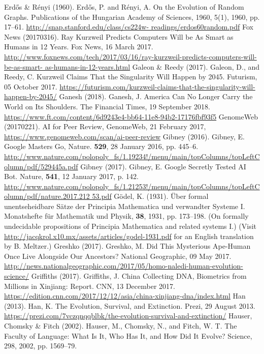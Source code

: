 \begin{multicols}{2}
\begin{thebibliography}{99}
 Erdős \& Rényi (1960). Erdős, P. and Rényi, A. On the Evolution of Random Graphs. Publications of the Hungarian Academy of Sciences, 1960, 5(1), 1960, pp. 17--61. \url{http://snap.stanford.edu/class/cs224w- readings/erdos60random.pdf}
 Fox News (20170316). Ray Kurzweil Predicts Computers Will be As Smart as Humans in 12 Years. Fox News, 16 March 2017. \url{http://www.foxnews.com/tech/2017/03/16/ray-kurzweil-predicts-computers-will-be-as-smart- as-humans-in-12-years.html}
 Galeon \& Reedy (2017). Galeon, D., and Reedy, C. Kurzweil Claims That the Singularity Will Happen by 2045. Futurism, 05 October 2017. \url{https://futurism.com/kurzweil-claims-that-the-singularity-will-happen-by-2045/}
 Ganesh (2018). Ganesh, J. America Can No Longer Carry the World on Its Shoulders. The Financial Times, 19 September 2018. \url{https://www.ft.com/content/6d9243e4-bb64-11e8-94b2-17176fbf93f5}
 GenomeWeb (20170221). AI for Peer Review, GenomeWeb, 21 February 2017, \url{https://www.genomeweb.com/scan/ai-peer-review}
 Gibney (2016). Gibney, E. Google Masters Go, Nature. \textbf{529}, 28 January 2016, pp. 445--6. \url{http://www.nature.com/polopoly_fs/1.19234!/menu/main/topColumns/topLeftColumn/pdf/529445a.pdf}
 Gibney (2017). Gibney, E. Google Secretly Tested AI Bot. Nature, \textbf{541}, 12 January 2017, p. 142. \url{http://www.nature.com/polopoly_fs/1.21253!/menu/main/topColumns/topLeftColumn/pdf/nature.2017.212 53.pdf}
 Gödel, K. (1931). Über formal unentseheidbare Sätze der Principia Mathematica und verwandter Systeme I. Monatshefte für Mathematik und Physik, \textbf{38}, 1931, pp. 173--198. (On formally undecidable propositions of Principia Mathematica and related systems I.) (Visit \url{http://jacqkrol.x10.mx/assets/articles/godel-1931.pdf} for an English translation by B. Meltzer.)
 Greshko (2017). Greshko, M. Did This Mysterious Ape-Human Once Live Alongside Our Ancestors? National Geographic, 09 May 2017. \url{http://news.nationalgeographic.com/2017/05/homo-naledi-human-evolution-science/}
 Griffiths (2017). Griffiths, J. China Collecting DNA, Biometrics from Millions in Xinjiang: Report. CNN, 13 December 2017. \url{https://edition.cnn.com/2017/12/12/asia/china-xinjiang-dna/index.html}
 Han (2013). Han, K. The Evolution, Survival, and Extinction. Prezi, 29 August 2013. \url{https://prezi.com/7vczqnqqblbk/the-evolution-survival-and-extinction/}
 Hauser, Chomsky \& Fitch (2002). Hauser, M., Chomsky, N., and Fitch, W. T. The Faculty of Language: What Is It, Who Has It, and How Did It Evolve? Science, 298, 2002, pp. 1569--79.

\end{thebibliography}
\end{multicols}

